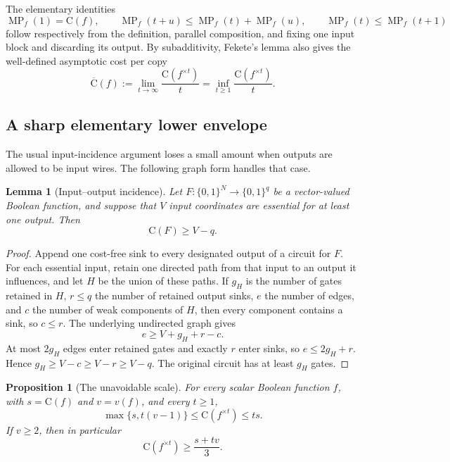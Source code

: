 \documentclass[11pt]{article}
\newtheorem{lemma}[theorem]{Lemma}
\newtheorem{proposition}[theorem]{Proposition}
\theoremstyle{definition}
\newcommand{\bits}{\{0,1\}}
\newcommand{\C}{\mathrm{C}}
\newcommand{\MP}{\operatorname{MP}}
\begin{document}
The elementary identities
\[
  \MP_f(1)=\C(f),\qquad
  \MP_f(t+u)\le\MP_f(t)+\MP_f(u),\qquad
  \MP_f(t)\le\MP_f(t+1)
\]
follow respectively from the definition, parallel composition, and fixing
one input block and discarding its output.  By subadditivity, Fekete's lemma
also gives the well-defined asymptotic cost per copy
\[
  \overline{\C}(f)
   :=\lim_{t\to\infty}\frac{\C(f^{\times t})}{t}
   =\inf_{t\ge1}\frac{\C(f^{\times t})}{t}.
\]

\subsection{A sharp elementary lower envelope}

The usual input-incidence argument loses a small amount when outputs are
allowed to be input wires.  The following graph form handles that case.

\begin{lemma}[Input--output incidence]
\label{lem:incidence}
Let $F:\bits^N\to\bits^q$ be a vector-valued Boolean function, and suppose
that $V$ input coordinates are essential for at least one output.  Then
\[
  \C(F)\ge V-q.
\]
\end{lemma}

\begin{proof}
Append one cost-free sink to every designated output of a circuit for $F$.
For each essential input, retain one directed path from that input to an
output it influences, and let $H$ be the union of these paths.  If $g_H$ is
the number of gates retained in $H$, $r\le q$ the number of retained output
sinks, $e$ the number of edges, and $c$ the number of weak components of $H$,
then every component contains a sink, so $c\le r$.  The underlying undirected
graph gives
\[
 e\ge V+g_H+r-c.
\]
At most $2g_H$ edges enter retained gates and exactly $r$ enter sinks, so
$e\le2g_H+r$.  Hence $g_H\ge V-c\ge V-r\ge V-q$.  The original circuit has
at least $g_H$ gates.
\end{proof}

\begin{proposition}[The unavoidable scale]
\label{prop:envelope}
For every scalar Boolean function $f$, with $s=\C(f)$ and $v=v(f)$, and
every $t\ge1$,
\begin{equation}
  \boxed{\max\{s,t(v-1)\}\le \C(f^{\times t})\le ts.}
  \label{eq:envelope}
\end{equation}
If $v\ge2$, then in particular
\[
  \C(f^{\times t})\ge\frac{s+tv}{3}.
\]
\end{proposition}
\end{document}
